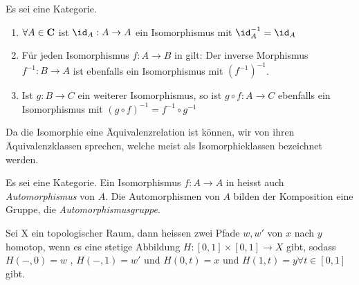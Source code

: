 \documentclass{article}
\begin{document}
		  \begin{lem}
		   \cite[Lemma 2.3.9]{Bra}
		  Es sei \CatC eine Kategorie.
		  \begin{enumerate}
			  \item \( \forall A \in \mathbf{C} \) ist \( \id_A :A \to A  \) ein Isomorphismus mit \( \id_A^{-1}=\id_A \)
			  \item F\"ur jeden Isomorphismus \( f: A \to B \) in \CatC gilt: Der inverse Morphismus \(f^{-1}: B \to A \) ist ebenfalls ein Isomorphismus mit \( \left( f^{-1} \right)^{-1} \).
			  \item Ist \(g: B \to C \) ein weiterer Isomorphismus, so ist \( g \circ f :A \to C \) ebenfalls ein Isomorphismus mit \( \left( g \circ f \right)^{-1} =f^{-1} \circ g^{-1} \)  
		  \end{enumerate}
		  	\end{lem}
		  	
		 \begin{defi}[Isomorphieklassen]
		  \cite[Definition 2.3.10]{Bra}
		 Da die Isomorphie eine \"Aquivalenzrelation ist k\"onnen, wir von ihren \"Aquivalenzklassen sprechen, welche meist als Isomorphieklassen bezeichnet werden.
		 \end{defi}
		 
		 
		\begin{defi}[Automorphismengruppen]
		\cite[Definition 2.3.13]{Bra}
		 Es sei \CatC eine Kategorie. Ein Isomorphismus \( f:A \to A \) in \CatC heisst auch \emph{Automorphismus} von $A$. Die Automorphismen von $A$ bilden \bzgl der Komposition eine Gruppe, die \emph{Automorphismusgruppe}.
		\end{defi}
		
		 \begin{defi}[Homotopieklasse]
		  \cite[Aufgabe 2.24]{Bra}
		 Sei X ein topologischer Raum, dann heissen zwei Pfade \( w,w'  \) von \(x \) nach \( y \) homotop, wenn es eine stetige Abbildung \( H : [0,1] \times [0,1 ] \to X \) gibt, sodass \( H(-,0) = w \) , \( H( -,1) =w' \) und \( H(0,t) =x \) und \(H(1,t) = y \forall t \in [0,1] \) gibt.
		 \end{defi}
		 
\end{document}
